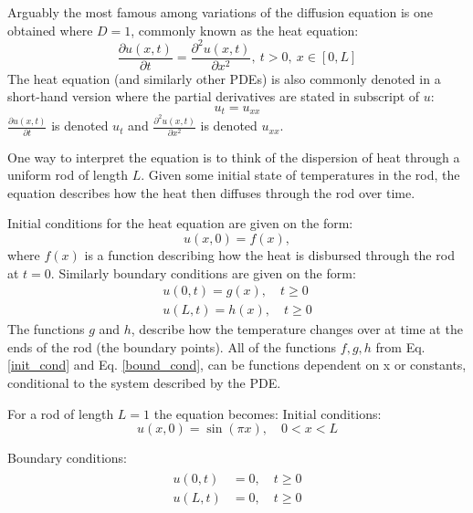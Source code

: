 Arguably the most famous among variations of the diffusion equation is one obtained where $D=1$, commonly known as the heat equation:
\begin{equation}\label{eq:diffu}
    \frac{\partial u(x,t)}{\partial t}=\frac{\partial^2 u(x,t)}{\partial x^2} , \ t>0, \ x\in [0, L]
\end{equation}
The heat equation (and similarly other PDEs) is also commonly denoted in a short-hand version where the partial derivatives are stated in subscript of $u$:  
\begin{equation}\label{u_tu_xx}
    u_t = u_{xx}
\end{equation}
$\frac{\partial u(x,t)}{\partial t}$ is denoted $u_t$ and $\frac{\partial^2 u(x,t)}{\partial x^2}$ is denoted $u_{xx}$.

One way to interpret the equation is to think of the dispersion of heat through a uniform rod of length $L$. Given some initial state of temperatures in the rod, the equation describes how the heat then diffuses through the rod over time. 

Initial conditions for the heat equation are given on the form: 
\begin{equation}\label{init_cond}
    u(x,0) = f(x),
\end{equation}
where $f(x)$ is a function describing how the heat is disbursed through the rod at $t=0$.
Similarly boundary conditions are given on the form: 
\begin{equation}\label{bound_cond}
    \begin{split}
        u(0, t) = g(x), \quad t \ge 0 \\
        u(L, t) = h(x), \quad t \ge 0
    \end{split}
\end{equation}
The functions $g$ and $h$, describe how the temperature changes over at time at the ends of the rod (the boundary points). 
All of the functions $f, g, h$ from Eq. \ref{init_cond} and Eq. \ref{bound_cond}, can be functions dependent on x or constants, conditional to the system described by the PDE. 

For a rod of length $L = 1$ the equation becomes:
\newline Initial conditions:
\begin{equation}\label{eq:initial_heat_eq}
    u(x, 0) = \sin(\pi x), \quad 0 < x < L
\end{equation}

Boundary conditions:
\begin{align}
\begin{split}\label{eq:boundaries_heat_eq}
    u(0,t) &= 0, \quad t\geq 0 \\
    u(L,t) &= 0, \quad t\geq 0
\end{split}
\end{align}

